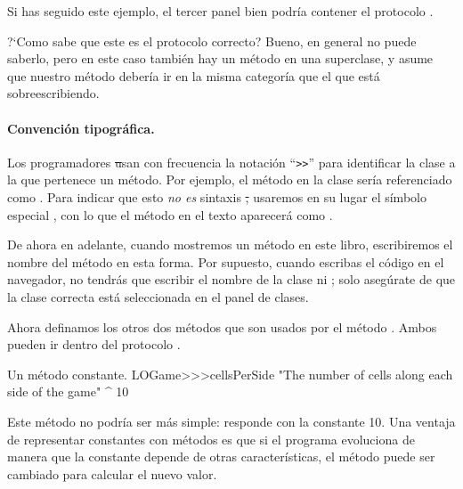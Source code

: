 \documentclass[a4paper,10pt,twoside]{book}
\begin{document}
Si has seguido este ejemplo, el tercer panel bien podr\'ia contener el protocolo .

?`Como sabe \pharo que este es el protocolo correcto? Bueno, en general  \pharo{} no puede saberlo, pero en este caso tambi\'en hay un m\'etodo  en una superclase, y \pharo asume que nuestro m\'etodo  deber\'ia ir en la misma categor\'ia que el que est\'a sobreescribiendo. 

\paragraph{Convenci\'on tipogr\'afica.} Los programadores \st usan con frecuencia la notaci\'on ``\verb|>>|'' para identificar la clase a la que pertenece un m\'etodo. Por ejemplo, el m\'etodo  en la clase  ser\'ia referenciado como .
Para indicar que esto \emph{no es} sintaxis \st, usaremos en su lugar el s\'imbolo especial \ct{>>>}, con lo que el m\'etodo en el texto aparecer\'a como .

De ahora en adelante, cuando mostremos un m\'etodo en este libro, escribiremos el nombre del m\'etodo en esta forma. Por supuesto, cuando escribas el c\'odigo en el navegador, no tendr\'as que escribir el nombre de la clase ni \ct{>>>}; solo aseg\'urate de que la clase correcta est\'a seleccionada en el panel de clases. 

Ahora definamos los otros dos m\'etodos que son usados por el m\'etodo . Ambos pueden ir dentro del protocolo .

\begin{method}[sbegamecellsperside]{Un m\'etodo constante.}
LOGame>>>cellsPerSide
   "The number of cells along each side of the game"
   ^ 10
\end{method}

Este m\'etodo no podr\'ia ser m\'as simple: responde con la constante 10. Una ventaja de representar constantes con m\'etodos es que si el programa evoluciona de manera que la constante depende de otras caracter\'isticas, el m\'etodo puede ser cambiado para calcular el nuevo valor. 
\end{document}
